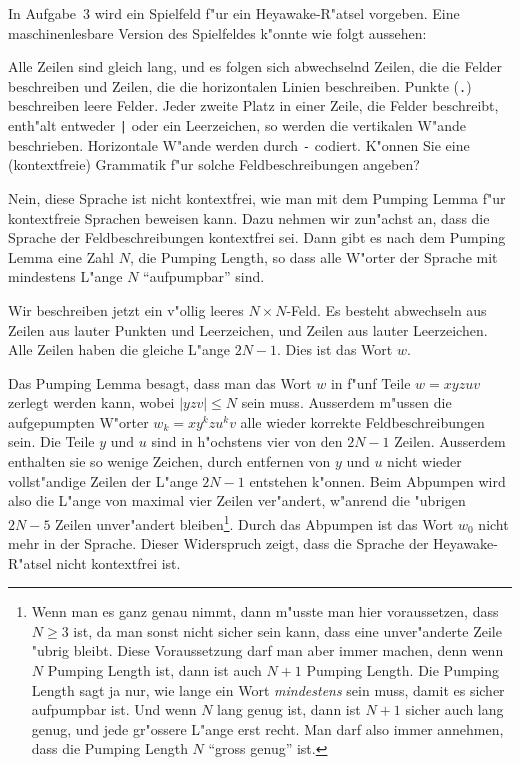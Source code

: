 In Aufgabe~3 wird ein Spielfeld f"ur ein Heyawake-R"atsel vorgeben.
Eine maschinenlesbare Version des Spielfeldes k"onnte wie 
folgt aussehen:
\begin{center}
\small
{}
\end{center}
Alle Zeilen sind gleich lang, und es folgen sich abwechselnd Zeilen,
die die Felder beschreiben und Zeilen, die die horizontalen Linien
beschreiben.
Punkte (\texttt{.}) beschreiben leere Felder.
Jeder zweite Platz in einer Zeile, die Felder beschreibt,
enth"alt entweder \texttt{|} oder ein Leerzeichen, so werden die
vertikalen W"ande beschrieben.
Horizontale W"ande werden durch \texttt{-} codiert.
K"onnen Sie eine (kontextfreie) Grammatik f"ur solche Feldbeschreibungen
angeben?

\begin{loesung}
Nein, diese Sprache ist nicht kontextfrei, wie man mit dem 
Pumping Lemma f"ur kontextfreie Sprachen beweisen kann.
Dazu nehmen wir zun"achst an, dass die Sprache der Feldbeschreibungen
kontextfrei sei. Dann gibt es nach dem Pumping Lemma eine Zahl $N$,
die Pumping Length, so dass alle W"orter der Sprache mit mindestens
L"ange $N$ ``aufpumpbar'' sind.

Wir beschreiben jetzt ein v"ollig leeres $N\times N$-Feld. Es besteht
abwechseln aus Zeilen aus lauter Punkten und Leerzeichen, und Zeilen
aus lauter Leerzeichen. Alle Zeilen haben die gleiche L"ange $2N-1$.
Dies ist das Wort $w$.

Das Pumping Lemma besagt, dass man das Wort  $w$ in f"unf Teile
$w=xyzuv$ zerlegt werden kann, wobei $|yzv|\le N$ sein muss.
Ausserdem m"ussen die aufgepumpten W"orter $w_k=xy^kzu^kv$ alle wieder
korrekte Feldbeschreibungen sein.
Die Teile $y$ und $u$ sind in h"ochstens vier von den $2N-1$ Zeilen.
Ausserdem enthalten sie so wenige Zeichen, durch entfernen von
$y$ und $u$ nicht wieder vollst"andige Zeilen der L"ange $2N-1$ entstehen
k"onnen.
Beim Abpumpen wird also die L"ange von maximal vier Zeilen ver"andert,
w"anrend die "ubrigen $2N-5$ Zeilen unver"andert bleiben\footnote{Wenn man
es ganz genau nimmt, dann m"usste man hier voraussetzen, dass $N \ge 3$ ist,
da man sonst nicht sicher sein kann, dass eine unver"anderte Zeile
"ubrig bleibt. Diese Voraussetzung darf man aber immer machen, denn
wenn $N$ Pumping Length ist, dann ist auch $N+1$ Pumping Length.
Die Pumping Length sagt ja nur, wie lange ein Wort {\em mindestens} sein
muss, damit es sicher aufpumpbar ist. Und wenn $N$ lang genug ist, dann ist
$N+1$ sicher auch lang genug, und jede gr"ossere L"ange erst recht.
Man darf also immer annehmen, dass die Pumping Length $N$ ``gross genug'' ist.}.
Durch das Abpumpen ist das Wort $w_0$ nicht mehr in der Sprache.
Dieser Widerspruch zeigt, dass die Sprache der Heyawake-R"atsel nicht
kontextfrei ist.
\end{loesung}

